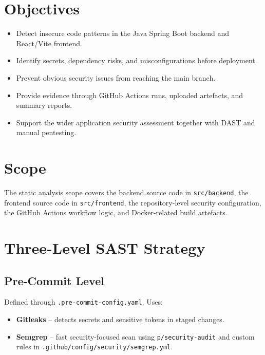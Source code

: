 \documentclass[12pt,a4paper]{report}
\begin{document}
\section{Objectives}

\begin{itemize}
  \item Detect insecure code patterns in the Java Spring Boot backend and React/Vite frontend.
  \item Identify secrets, dependency risks, and misconfigurations before deployment.
  \item Prevent obvious security issues from reaching the main branch.
  \item Provide evidence through GitHub Actions runs, uploaded artefacts, and summary reports.
  \item Support the wider application security assessment together with DAST and manual pentesting.
\end{itemize}

\section{Scope}

The static analysis scope covers the backend source code in \texttt{src/backend}, the frontend source code in \texttt{src/frontend}, the repository-level security configuration, the GitHub Actions workflow logic, and Docker-related build artefacts.

\section{Three-Level SAST Strategy}

\subsection{Pre-Commit Level}

Defined through \texttt{.pre-commit-config.yaml}. Uses:
\begin{itemize}
  \item \textbf{Gitleaks} -- detects secrets and sensitive tokens in staged changes.
  \item \textbf{Semgrep} -- fast security-focused scan using \texttt{p/security-audit} and custom rules in \texttt{.github/config/security/semgrep.yml}.
\end{itemize}
\end{document}
